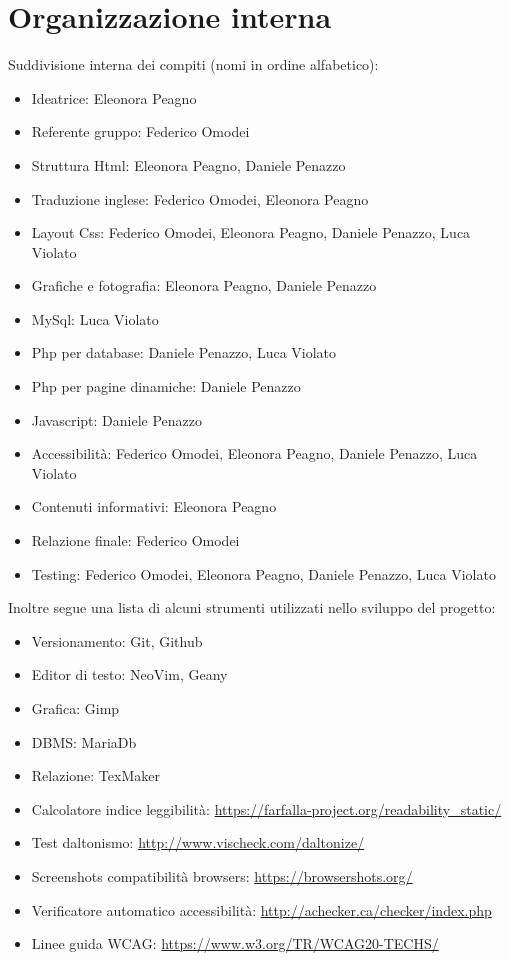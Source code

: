 \section{Organizzazione interna}
Suddivisione interna dei compiti (nomi in ordine alfabetico):
\begin{itemize}
\item Ideatrice: Eleonora Peagno
\item Referente gruppo: Federico Omodei
\item Struttura Html: Eleonora Peagno, Daniele Penazzo
\item Traduzione inglese: Federico Omodei, Eleonora Peagno
\item Layout Css: Federico Omodei, Eleonora Peagno, Daniele Penazzo, Luca Violato
\item Grafiche e fotografia: Eleonora Peagno, Daniele Penazzo
\item MySql: Luca Violato
\item Php per database: Daniele Penazzo, Luca Violato
\item Php per pagine dinamiche: Daniele Penazzo
\item Javascript: Daniele Penazzo
\item Accessibilità: Federico Omodei, Eleonora Peagno, Daniele Penazzo, Luca Violato
\item Contenuti informativi: Eleonora Peagno
\item Relazione finale: Federico Omodei
\item Testing: Federico Omodei, Eleonora Peagno, Daniele Penazzo, Luca Violato
\end{itemize}

\pagebreak

Inoltre segue una lista di alcuni strumenti utilizzati nello sviluppo del progetto:
\begin{itemize}
\item Versionamento: Git, Github
\item Editor di testo: NeoVim, Geany
\item Grafica: Gimp
\item DBMS: MariaDb
\item Relazione: TexMaker
\item Calcolatore indice leggibilità: \url{https://farfalla-project.org/readability_static/}
\item Test daltonismo: \url{http://www.vischeck.com/daltonize/}
\item Screenshots compatibilità browsers: \url{https://browsershots.org/}
\item Verificatore automatico accessibilità: \url{http://achecker.ca/checker/index.php}
\item Linee guida WCAG: \url{https://www.w3.org/TR/WCAG20-TECHS/}
\end{itemize}
